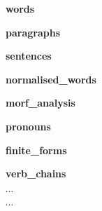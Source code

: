 \documentclass[landscape,footrule]{foils}
\begin{document}
\begin{triangles}
\item \textbf{words} \vspace*{0.5ex}
\begin{triangles}
\item \textbf{paragraphs}
\item \textbf{sentences}
\item \textbf{normalised\_words}
\item \textbf{morf\_analysis} \vspace*{0.5ex}
\begin{diamonds}
\item {}\vspace*{1ex}
\end{diamonds} 
\item \textbf{pronouns}\vspace*{0.5ex}
\begin{diamonds}
\item {}\vspace*{1ex}
\end{diamonds} 
\item \textbf{finite\_forms}\vspace*{0.5ex}
\begin{diamonds}
\item \blue{$\varnothing$}\vspace*{1ex}
\end{diamonds} 
\item \textbf{verb\_chains}

\item \textbf{$\cdots$} 
\end{triangles}
\item \textbf{$\cdots$}
\end{triangles}
\end{document}
